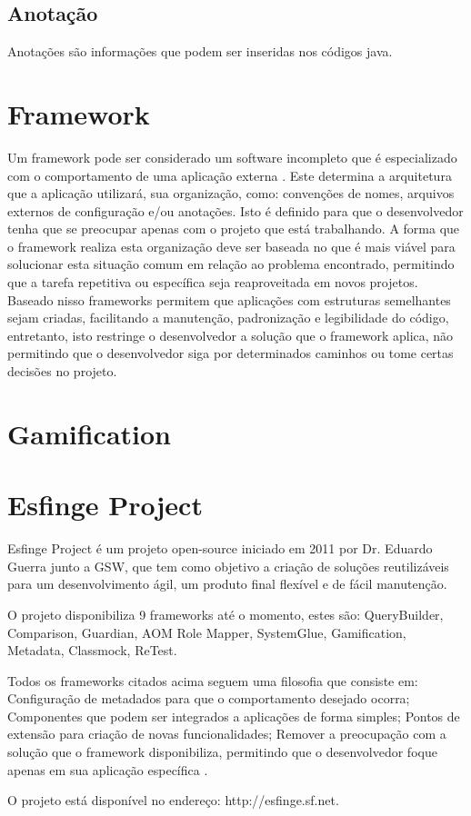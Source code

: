 \subsection{Anotação}

\par Anotações são informações que podem ser inseridas nos códigos java.

\section{Framework}

\par Um framework pode ser considerado um software incompleto que é especializado com o comportamento de uma aplicação externa \cite{johnson1988designing}. Este determina a arquitetura que a aplicação utilizará, sua organização, como: convenções de nomes, arquivos externos de configuração e/ou anotações. Isto é definido para que o desenvolvedor tenha que se preocupar apenas com o projeto que está trabalhando. A forma que o framework realiza esta organização deve ser baseada no que é mais viável para solucionar esta situação comum em relação ao problema encontrado, permitindo que a tarefa repetitiva ou específica seja reaproveitada em novos projetos.
Baseado nisso frameworks permitem que aplicações com estruturas semelhantes sejam criadas, facilitando a manutenção, padronização e legibilidade do código, entretanto, isto restringe o desenvolvedor a solução que o framework aplica, não permitindo que o desenvolvedor siga por determinados caminhos ou tome certas decisões no projeto.\cite{gamma2009padroes}

\section{Gamification}


\section{Esfinge Project}

\par Esfinge Project é um projeto open-source iniciado em 2011 por Dr. Eduardo Guerra junto a GSW, que tem como objetivo a criação de soluções reutilizáveis para um desenvolvimento ágil, um produto final flexível e de fácil manutenção.
\par O projeto disponibiliza 9 frameworks até o momento, estes são: QueryBuilder, Comparison, Guardian, AOM Role Mapper, SystemGlue, Gamification, Metadata, Classmock, ReTest.
\par Todos os frameworks citados acima seguem uma filosofia que consiste em: Configuração de metadados para que o comportamento desejado ocorra; Componentes que podem ser integrados a aplicações de forma simples; Pontos de extensão para criação de novas funcionalidades; Remover a preocupação com a solução que o framework disponibiliza, permitindo que o desenvolvedor foque apenas em sua aplicação específica \cite{esfinge2011}.
\par O projeto está disponível no endereço: http://esfinge.sf.net.

